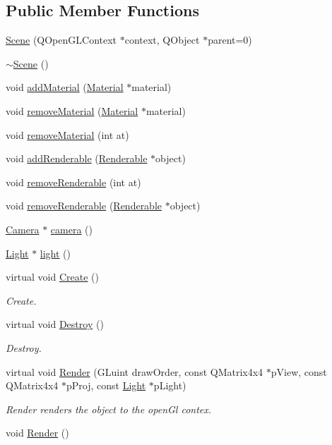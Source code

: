 \subsection*{Public Member Functions}
\begin{DoxyCompactItemize}
\item 
\hyperlink{class_scene_a209847445cd18171aeae4a1a7637efea}{Scene} (Q\+Open\+G\+L\+Context $\ast$context, Q\+Object $\ast$parent=0)
\item 
\hyperlink{class_scene_a3b8cec2e32546713915f8c6303c951f1}{$\sim$\+Scene} ()
\item 
void \hyperlink{class_scene_a99ecb7628446690510dd1bb27dffc8e5}{add\+Material} (\hyperlink{class_material}{Material} $\ast$material)
\item 
void \hyperlink{class_scene_ac9add8bc84e2fcf26fede56e1d40a8ff}{remove\+Material} (\hyperlink{class_material}{Material} $\ast$material)
\item 
void \hyperlink{class_scene_a14884548876ba098f476afa0a4c6c030}{remove\+Material} (int at)
\item 
void \hyperlink{class_scene_a621e3f935f8bec1fa2d6b29eeeda8eaa}{add\+Renderable} (\hyperlink{class_renderable}{Renderable} $\ast$object)
\item 
void \hyperlink{class_scene_a585aebb726cb8a3ceca6cc8189e7bcd7}{remove\+Renderable} (int at)
\item 
void \hyperlink{class_scene_a161f58ff37be2425a9d716e73ba8d3b3}{remove\+Renderable} (\hyperlink{class_renderable}{Renderable} $\ast$object)
\item 
\hyperlink{class_camera}{Camera} $\ast$ \hyperlink{class_scene_a1845161fcd088622a1288a6c41bcd574}{camera} ()
\item 
\hyperlink{class_light}{Light} $\ast$ \hyperlink{class_scene_a01d2124c572f0341cb317745d3b7a0a4}{light} ()
\item 
virtual void \hyperlink{class_scene_a3a16f308d18a168f7778b9c3a29b3ac5}{Create} ()
\begin{DoxyCompactList}\small\item\em Create. \end{DoxyCompactList}\item 
virtual void \hyperlink{class_scene_ac8261e2bf3f39d17c921f0ccbfb1f48f}{Destroy} ()
\begin{DoxyCompactList}\small\item\em Destroy. \end{DoxyCompactList}\item 
virtual void \hyperlink{class_scene_a61d176e58a0cf69bb201b3ac052ba84e}{Render} (G\+Luint draw\+Order, const Q\+Matrix4x4 $\ast$p\+View, const Q\+Matrix4x4 $\ast$p\+Proj, const \hyperlink{class_light}{Light} $\ast$p\+Light)
\begin{DoxyCompactList}\small\item\em Render renders the object to the open\+Gl contex. \end{DoxyCompactList}\item 
void \hyperlink{class_scene_a91913b921d41d374e00eac347358dc14}{Render} ()
\end{DoxyCompactItemize}
